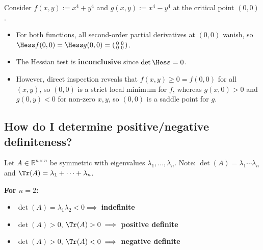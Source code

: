 \begin{aiexample}
Consider $f(x,y) := x^4 + y^4$ and $g(x,y) := x^4 - y^4$ at the critical point $(0,0)$.
\begin{itemize}
  \item For both functions, all second-order partial derivatives at $(0,0)$ vanish, so $\Hess f(0,0) = \Hess g(0,0) = \left(\begin{smallmatrix} 0 & 0 \\ 0 & 0 \end{smallmatrix}\right)$.
  \item The Hessian test is \textbf{inconclusive} since $\det \Hess = 0$.
  \item However, direct inspection reveals that $f(x,y) \geq 0 = f(0,0)$ for all $(x,y)$, so $(0,0)$ is a strict local minimum for $f$, whereas $g(x,0) > 0$ and $g(0,y) < 0$ for non-zero $x,y$, so $(0,0)$ is a saddle point for $g$.
\end{itemize}
\end{aiexample}

\subsection{How do I determine positive/negative definiteness?}

Let $A \in \mathbb{R}^{n\times n}$ be symmetric with eigenvalues $\lambda_1,\dots,\lambda_n$.
Note: $\det(A) = \lambda_1\cdots\lambda_n$ and $\Tr(A) = \lambda_1+\dots+\lambda_n$.

\textbf{For $n = 2$:}
\begin{itemize}
  \item $\det(A) = \lambda_1\lambda_2 < 0 \implies$ \textbf{indefinite}
  \item $\det(A) > 0$, $\Tr(A) > 0 \implies$ \textbf{positive definite}
  \item $\det(A) > 0$, $\Tr(A) < 0 \implies$ \textbf{negative definite}
\end{itemize}

